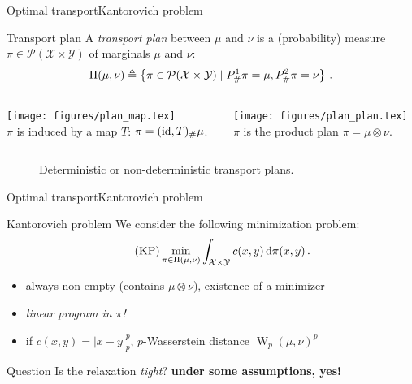 \documentclass[9pt,xcolor={dvipsnames}]{beamer}
\begin{document}
\begin{frame}{Optimal transport}{Kantorovich problem}
    \label{slide:fig-plans}
    \begin{block}{Transport plan \cite{kantorovich1942translocation}}
        A \emph{transport plan} between $\mu$ and $\nu$ is a (probability) measure $\pi \in\mathcal{P}(\mathcal{X}\times \mathcal{Y})$ of marginals $\mu$ and $\nu$:
        $$\Pi(\mu,\nu)\triangleq \left\{\pi\in\mathcal{P}(\mathcal{X}\times\mathcal{Y})\mid P^1_\#\pi=\mu, P^2_\#\pi=\nu\right\}\,.$$
    \end{block}
    \vspace{-5mm}
    \begin{columns}
        \begin{column}[b]{.5\textwidth}
            \begin{center}
                \texttt{[image: figures/plan\_map.tex]}\\
                \small{$\pi$ is induced by a map $T$: $\pi=(\operatorname{id}, T)_\#\mu$.}
            \end{center}
        \end{column}
        \begin{column}[b]{.5\textwidth}
            \begin{center}
                \texttt{[image: figures/plan\_plan.tex]}\\
                \small{$\pi$ is the product plan $\pi=\mu\otimes\nu$.}
            \end{center}
        \end{column}
    \end{columns}
    \begin{figure}
        \caption{Deterministic or non-deterministic transport plans.}
    \end{figure}
\end{frame}
\begin{frame}{Optimal transport}{Kantorovich problem}
        \begin{block}{Kantorovich problem}
            We consider the following minimization problem:
            \begin{equation*}
                \tag{KP}
                \label{eq:OT}
                \min_{\pi\in\Pi(\mu,\nu)} \int_{\mathcal{X}\times\mathcal{Y}} c(x,y)\,\mathrm d\pi(x,y)\,.
            \end{equation*}
        \end{block}

        \begin{itemize}
            \item always non-empty (contains $\mu\otimes\nu$), existence of a minimizer
            \item \emph{linear program in $\pi$!}
            \item if $c(x,y)=|x-y|_p^p$, $p$-Wasserstein distance $\operatorname{W}_p(\mu,\nu)^p$
        \end{itemize}
        \begin{block}{Question}
            Is the relaxation \emph{tight}? \textbf{under some assumptions, yes!}
    \end{block}
\end{frame}
\end{document}

